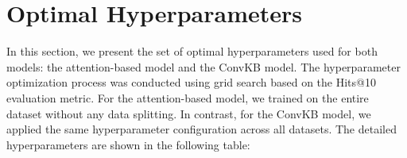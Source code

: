 \appendix
\renewcommand{\chaptername}{Appendix}

\chapter{Optimal Hyperparameters}
\label{appendix:Appendix1}

In this section, we present the set of optimal hyperparameters used for both models: the attention-based model and the ConvKB model. The hyperparameter optimization process was conducted using grid search based on the Hits@10 evaluation metric. For the attention-based model, we trained on the entire dataset without any data splitting. In contrast, for the ConvKB model, we applied the same hyperparameter configuration across all datasets. The detailed hyperparameters are shown in the following table:


\begin{table}[htbp]
	\begin{center}
	\end{center}
\end{table}
